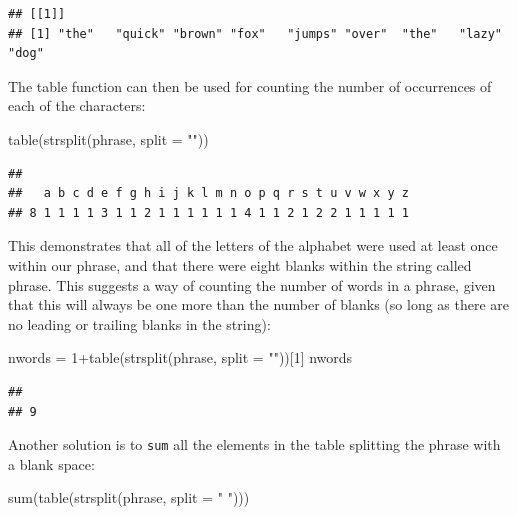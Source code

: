 \documentclass[
]{book}
\newenvironment{Shaded}{\begin{snugshade}}{\end{snugshade}}
\newcommand{\AttributeTok}[1]{\textcolor[rgb]{0.77,0.63,0.00}{#1}}
\newcommand{\DecValTok}[1]{\textcolor[rgb]{0.00,0.00,0.81}{#1}}
\newcommand{\FunctionTok}[1]{\textcolor[rgb]{0.00,0.00,0.00}{#1}}
\newcommand{\NormalTok}[1]{#1}
\newcommand{\OtherTok}[1]{\textcolor[rgb]{0.56,0.35,0.01}{#1}}
\newcommand{\SpecialCharTok}[1]{\textcolor[rgb]{0.00,0.00,0.00}{#1}}
\newcommand{\StringTok}[1]{\textcolor[rgb]{0.31,0.60,0.02}{#1}}
\begin{document}
\begin{verbatim}
## [[1]]
## [1] "the"   "quick" "brown" "fox"   "jumps" "over"  "the"   "lazy"  "dog"
\end{verbatim}

The table function can then be used for counting the number of occurrences of each of the characters:

\begin{Shaded}
\begin{Highlighting}[]
\FunctionTok{table}\NormalTok{(}\FunctionTok{strsplit}\NormalTok{(phrase, }\AttributeTok{split =} \StringTok{""}\NormalTok{))}
\end{Highlighting}
\end{Shaded}

\begin{verbatim}
## 
##   a b c d e f g h i j k l m n o p q r s t u v w x y z 
## 8 1 1 1 1 3 1 1 2 1 1 1 1 1 1 4 1 1 2 1 2 2 1 1 1 1 1
\end{verbatim}

This demonstrates that all of the letters of the alphabet were used at least once within our phrase, and that there were eight blanks within the string called phrase. This suggests a way of counting the number of words in a phrase, given that this will always be one more than the number of blanks (so long as there are no leading or trailing blanks in the string):

\begin{Shaded}
\begin{Highlighting}[]
\NormalTok{nwords }\OtherTok{=} \DecValTok{1}\SpecialCharTok{+}\FunctionTok{table}\NormalTok{(}\FunctionTok{strsplit}\NormalTok{(phrase, }\AttributeTok{split =} \StringTok{""}\NormalTok{))[}\DecValTok{1}\NormalTok{]}
\NormalTok{nwords}
\end{Highlighting}
\end{Shaded}

\begin{verbatim}
##   
## 9
\end{verbatim}

Another solution is to \texttt{sum} all the elements in the table splitting the phrase with a blank space:

\begin{Shaded}
\begin{Highlighting}[]
\FunctionTok{sum}\NormalTok{(}\FunctionTok{table}\NormalTok{(}\FunctionTok{strsplit}\NormalTok{(phrase, }\AttributeTok{split =} \StringTok{" "}\NormalTok{)))}
\end{Highlighting}
\end{Shaded}
\end{document}
